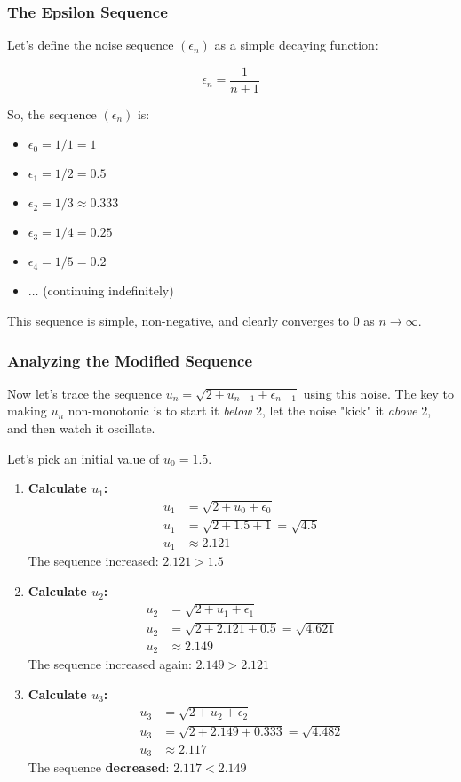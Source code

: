 \documentclass[12pt,a4paper]{article}
\theoremstyle{definition}
\begin{document}
\subsubsection{The Epsilon Sequence}

Let's define the noise sequence $(\epsilon_n)$ as a simple decaying function:

\[
\epsilon_n = \frac{1}{n+1}
\]

So, the sequence $(\epsilon_n)$ is:
\begin{itemize}
    \item $\epsilon_0 = 1/1 = 1$
    \item $\epsilon_1 = 1/2 = 0.5$
    \item $\epsilon_2 = 1/3 \approx 0.333$
    \item $\epsilon_3 = 1/4 = 0.25$
    \item $\epsilon_4 = 1/5 = 0.2$
    \item $\ldots$ (continuing indefinitely)
\end{itemize}

This sequence is simple, non-negative, and clearly converges to 0 as $n \to \infty$.

\subsubsection{Analyzing the Modified Sequence}

Now let's trace the sequence $u_n = \sqrt{2 + u_{n-1} + \epsilon_{n-1}}$ using this noise. The key to making $u_n$ non-monotonic is to start it \textit{below} 2, let the noise "kick" it \textit{above} 2, and then watch it oscillate.

Let's pick an initial value of \textbf{$u_0 = 1.5$}.

\begin{enumerate}
    \item \textbf{Calculate $u_1$:}
    \begin{align*}
    u_1 &= \sqrt{2 + u_0 + \epsilon_0}\\
    u_1 &= \sqrt{2 + 1.5 + 1} = \sqrt{4.5}\\
    u_1 &\approx 2.121
    \end{align*}
    The sequence increased: $2.121 > 1.5$
    
    \item \textbf{Calculate $u_2$:}
    \begin{align*}
    u_2 &= \sqrt{2 + u_1 + \epsilon_1}\\
    u_2 &= \sqrt{2 + 2.121 + 0.5} = \sqrt{4.621}\\
    u_2 &\approx 2.149
    \end{align*}
    The sequence increased again: $2.149 > 2.121$
    
    \item \textbf{Calculate $u_3$:}
    \begin{align*}
    u_3 &= \sqrt{2 + u_2 + \epsilon_2}\\
    u_3 &= \sqrt{2 + 2.149 + 0.333} = \sqrt{4.482}\\
    u_3 &\approx 2.117
    \end{align*}
    The sequence \textbf{decreased}: $2.117 < 2.149$
\end{enumerate}
\end{document}
